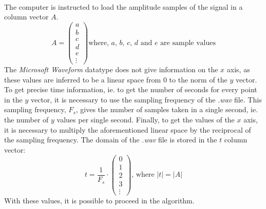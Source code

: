 \documentclass{article}
\begin{document}
\paragraph*{}
The computer is instructed to load the amplitude samples of the signal in a 
column vector $A$.
$$A =
\begin{pmatrix}
	a \\
	b \\
	c \\
	d \\
	e \\
	\vdots
\end{pmatrix}\text{where, $a$, $b$, $c$, $d$ and $e$ are sample values}
$$
The \textit{Microsoft Waveform} datatype does not give information on the $x$ 
axis, as these values are inferred to be a linear space from $0$ to the norm 
of the $y$ vector. To get precise time information, ie. to get the number of 
seconds for every point in the $y$ vector, it is necessary to use the sampling 
frequency of the \textit{.wav} file. This sampling frequency, $F_s$, gives the 
number of samples taken in a single second, ie. the number of $y$ values per 
single second. Finally, to get the values of the $x$ axis, it is necessary to 
multiply the aforementioned linear space by the reciprocal of the sampling 
frequency. The domain of the \textit{.wav} file is stored in the $t$ column 
vector:
$$t = \frac{1}{F_s} \cdot
\begin{pmatrix}
	0 \\
	1 \\
	2 \\
	3 \\
	\vdots
\end{pmatrix}\text{, where $|t| = |A|$}
$$
With these values, it is possible to proceed in the algorithm.
\end{document}
